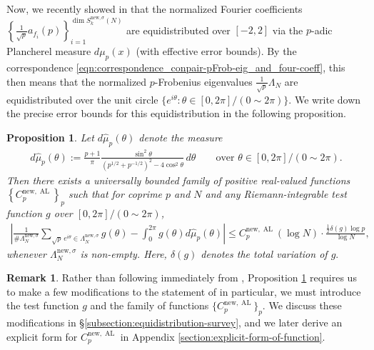 \documentclass[11pt,letterpaper,reqno]{amsart}
\newtheorem{proposition}[theorem]{Proposition}
\theoremstyle{definition}
\newtheorem{remark}[theorem]{Remark}
\numberwithin{equation}{section}
\numberwithin{figure}{section}
\numberwithin{table}{section}
\newcommand{\lrabs}[1]{\!\left\lvert #1 \right\lvert}
\newcommand{\lrcb}[1]{\!\left\{#1\right\}}
\newcommand{\nw}{\mathrm{new}}
\begin{document}
Now, we recently showed in \cite[Theorem 1.1]{KMRX} that the normalized Fourier coefficients \\$\lrcb{\frac{1}{\sqrt p} a_{f_i}(p)}_{i=1}^{\dim S_k^{\nw,\sigma}(N)}$ are equidistributed over $[-2,2]$ via the $p$-adic Plancherel measure $d\mu_p(x)$ (with effective error bounds). By the correspondence \eqref{eqn:correspondence_conpair-pFrob-eig_and_four-coeff}, this then means that the normalized $p$-Frobenius eigenvalues $\frac{1}{\sqrt p} \Lambda_N$ are equidistributed over the unit circle $\{e^{i\theta} : \theta \in [0,2\pi]/(0 \sim 2\pi)\}$.
We write down the precise error bounds for this equidistribution in the following proposition.
\begin{proposition} \label{prop:p-Frob}
Let $d\hat\mu_p(\theta)$ denote the measure
\begin{align}
    d\hat\mu_p(\theta) := \frac{p + 1}{\pi}  \frac{\sin^2 \theta}{\left( p^{1/2} + p^{-1/2} \right)^2 - 4 \cos^2 \theta} \, d \theta \qquad \text{over } \theta \in [0,2\pi]/(0 \sim 2\pi).
\end{align}
Then there exists a universally bounded family of positive real-valued functions $\left\{C_p^{\nw, {\operatorname{AL}}}\right\}_{p}$ such that for coprime $p$ and $N$ and any Riemann-integrable test function $g$ over $[0,2\pi]/(0 \sim 2\pi)$,
\begin{align}
    \lrabs{
        \frac{1}{\# \Lambda_N^{\nw, \sigma}} \sum_{ \sqrt{p} \, e^{i \theta} \in \Lambda_N^{\nw, \sigma}} g\left( \theta \right) - \int_0^{2\pi} g(\theta) d \hat \mu_p(\theta)   
    } \le
    C_p^{\nw, {\operatorname{AL}}}(\log N) \cdot  \frac{\frac{1}{2} \delta(g) \log p}{\log N},
\end{align}
whenever $\Lambda_N^{\nw, \sigma}$ is non-empty. Here, $\delta(g)$ denotes the total variation of $g.$
\end{proposition}

\begin{remark}
    Rather than following immediately from \cite[Theorem 1.1]{KMRX}, Proposition \ref{prop:p-Frob} requires us to make a few modifications to the statement of \cite[Theorem 1.1]{KMRX} in particular, we must introduce the test function $g$ and the family of functions $\{C_p^{\nw, \operatorname{AL}}\}_p.$ We discuss these modifications in \S\ref{subsection:equidistribution-survey}, and we later derive an explicit form for $C_p^{\nw,\operatorname{AL}}$ in Appendix \ref{section:explicit-form-of-function}.
\end{remark}
\end{document}
